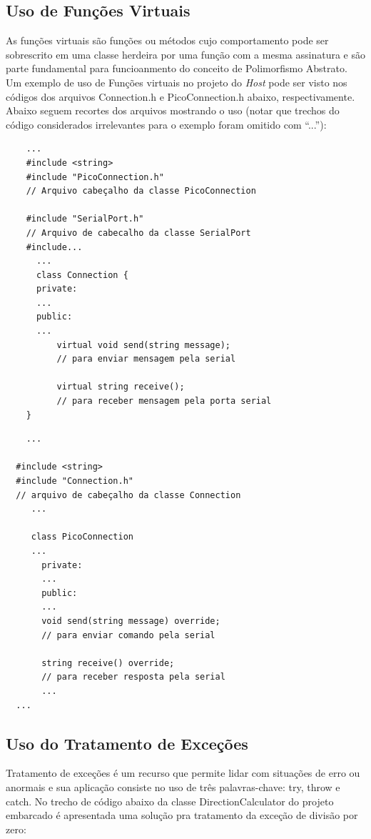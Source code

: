 \documentclass[10pt,twocolumn,letterpaper]{article}
\begin{document}
\subsection{Uso de Funções Virtuais}
As funções virtuais são funções ou métodos cujo comportamento pode ser sobrescrito em uma classe herdeira por uma função com a mesma assinatura e são parte fundamental para funcioanmento do conceito de Polimorfismo Abstrato.
Um exemplo de uso de Funções virtuais no projeto do \emph{Host} pode ser visto nos códigos dos arquivos Connection.h e PicoConnection.h abaixo, respectivamente. Abaixo seguem recortes dos arquivos mostrando o uso (notar que trechos do código considerados irrelevantes para o exemplo foram omitido com ``...''):
{\scriptsize
\begin{verbatim}
    ...
    #include <string>
    #include "PicoConnection.h" 
    // Arquivo cabeçalho da classe PicoConnection
    
    #include "SerialPort.h" 
    // Arquivo de cabecalho da classe SerialPort
    #include...
      ...
      class Connection {
      private:
      ...
      public:
      ...
          virtual void send(string message); 
          // para enviar mensagem pela serial
          
          virtual string receive(); 
          // para receber mensagem pela porta serial
    }
  \end{verbatim}
}  
{\scriptsize
\begin{verbatim}
    ...
  
  #include <string>
  #include "Connection.h" 
  // arquivo de cabeçalho da classe Connection
     ...
   
     class PicoConnection 
     ...
       private:
       ...
       public:
       ...
       void send(string message) override; 
       // para enviar comando pela serial

       string receive() override; 
       // para receber resposta pela serial
       ...
  ...  
\end{verbatim}
}

\subsection{Uso do Tratamento de Exceções}
Tratamento de exceções é um recurso que permite lidar com situações de erro ou anormais e sua aplicação consiste no uso de três palavras-chave: try, throw e catch.
No trecho de código abaixo da classe DirectionCalculator do projeto embarcado é apresentada uma solução pra tratamento da exceção de divisão por zero:
\end{document}
